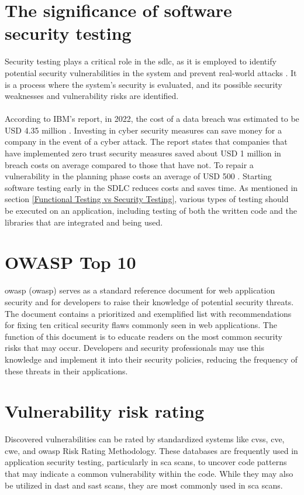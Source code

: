 \section{The significance of software security testing}
Security testing plays a critical role in the \acrlong{sdlc}, as it is employed to identify potential security vulnerabilities in the system and prevent real-world attacks \cite{whysectest}. It is a process where the system's security is evaluated, and its possible security weaknesses and vulnerability risks are identified. 
\\~\\
According to IBM's report, in 2022, the cost of a data breach was estimated to be USD 4.35 million \cite{databreach}. Investing in cyber security measures can save money for a company in the event of a cyber attack. The report states that companies that have implemented zero trust security measures saved about USD 1 million in breach costs on average compared to those that have not. To repair a vulnerability in the planning phase costs an average of USD 500 \cite{fixvulnerability}. Starting software testing early in the SDLC reduces costs and saves time. As mentioned in section \ref{Functional Testing vs Security Testing}, various types of testing should be executed on an application, including testing of both the written code and the libraries that are integrated and being used.

\section{OWASP Top 10}
\acrlong{owasp} (\acrshort{owasp}) serves as a standard reference document for web application security and for developers to raise their knowledge of potential security threats. The document contains a prioritized and exemplified list with recommendations for fixing ten critical security flaws commonly seen in web applications. The function of this document is to educate readers on the most common security risks that may occur. Developers and security professionals may use this knowledge and implement it into their security policies, reducing the frequency of these threats in their applications. 


\section{Vulnerability risk rating}
Discovered vulnerabilities can be rated by standardized systems like \acrshort{cvss}, \acrshort{cve}, \acrshort{cwe}, and \acrshort{owasp} Risk Rating Methodology. These databases are frequently used in application security testing, particularly in \acrshort{sca} scans, to uncover code patterns that may indicate a common vulnerability within the code. While they may also be utilized in \acrshort{dast} and \acrshort{sast} scans, they are most commonly used in \acrshort{sca} scans. 



